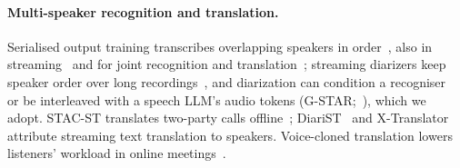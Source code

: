 \paragraph{Multi-speaker recognition and translation.} Serialised output training transcribes overlapping speakers
in order~\citep{kanda2020sot,kanda2021saasr}, also in streaming~\citep{kanda2022tsot} and for joint recognition and
translation~\citep{papi2023tsot}; streaming diarizers keep speaker order over long
recordings~\citep{park2024sortformer,medennikov2025streaming}, and diarization can condition a
recogniser~\citep{polok2026dicow,huo2026tagspeech} or be interleaved with a speech LLM's audio tokens
(G-STAR;~\citealp{peng2026gstar}), which we adopt. STAC-ST translates two-party calls offline~\citep{zuluaga2023stac};
DiariST~\citep{yang2024diarist} and X-Translator~\citep{zhao2026xtranslator} attribute streaming text translation to
speakers. Voice-cloned translation lowers listeners' workload in online meetings~\citep{ma2026samevoice}.
